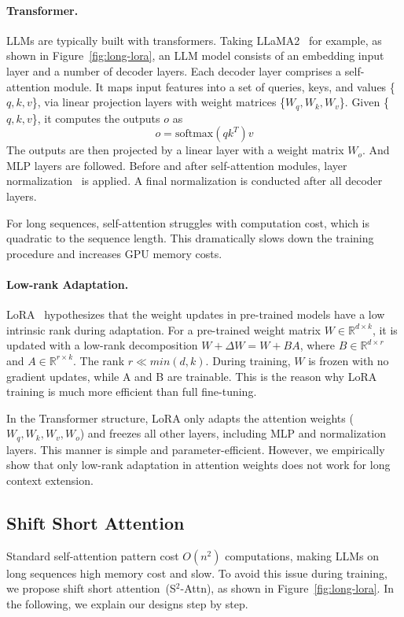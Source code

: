 \documentclass{article} %
\begin{document}
\paragraph{Transformer.}
LLMs are typically built with transformers. Taking LLaMA2~\citep{llama2} for example, as shown in Figure~\ref{fig:long-lora}, an LLM model consists of an embedding input layer and a number of decoder layers. Each decoder layer comprises a self-attention module. It maps input features into a set of queries, keys, and values \{$q, k, v$\}, via linear projection layers with weight matrices \{$W_q, W_k, W_v$\}. Given \{$q, k, v$\}, it computes the outputs $o$ as
\begin{equation}
    o = \mathrm{softmax}(qk^T)v
\end{equation}
The outputs are then projected by a linear layer with a weight matrix $W_o$. And MLP layers are followed. Before and after self-attention modules, layer normalization~\citep{layernorm} is applied. A final normalization is conducted after all decoder layers.

For long sequences, self-attention struggles with computation cost, which is quadratic to the sequence length. This dramatically slows down the training procedure and increases GPU memory costs.

\paragraph{Low-rank Adaptation.}
LoRA~\citep{lora} hypothesizes that the weight updates in pre-trained models have a low intrinsic rank during adaptation.
For a pre-trained weight matrix $W \in \mathbb{R}^{d\times k}$, it is updated with a low-rank decomposition $W+\Delta W=W + BA$, where $B\in \mathbb{R}^{d\times r}$ and $A\in \mathbb{R}^{r\times k}$. The rank $r\ll min(d,k)$. During training, $W$ is frozen with no gradient updates, while A and B are trainable. This is the reason why LoRA training is much more efficient than full fine-tuning.

In the Transformer structure, LoRA only adapts the attention weights ($W_q, W_k, W_v, W_o$) and freezes all other layers, including MLP and normalization layers. This manner is simple and parameter-efficient. However, we empirically show that only low-rank adaptation in attention weights does not work for long context extension.


\subsection{Shift Short Attention}
Standard self-attention pattern cost $O(n^2)$ computations, making LLMs on long sequences high memory cost and slow. To avoid this issue during training, we propose shift short attention~(S$^2$-Attn), as shown in Figure~\ref{fig:long-lora}. In the following, we explain our designs step by step.
\end{document}
